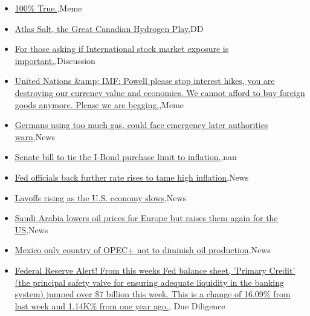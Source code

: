 \documentclass{article}%
\begin{document}
%
\begin{itemize}%
\item%
\href{https://reddit.com/r/wallstreetbets/comments/xxonc9/100\_true/}{100\% True.},Meme%
\item%
\href{https://reddit.com/r/Baystreetbets/comments/xx9i0i/atlas\_salt\_the\_great\_canadian\_hydrogen\_play/}{Atlas Salt, the Great Canadian Hydrogen Play},DD%
\item%
\href{https://reddit.com/r/StockMarket/comments/xxk02m/for\_those\_asking\_if\_international\_stock\_market/}{For those asking if International stock market exposure is important.},Discussion%
\item%
\href{https://reddit.com/r/StockMarket/comments/xxgjta/united\_nations\_imf\_powell\_please\_stop\_interest/}{United Nations \&amp; IMF: Powell please stop interest hikes, you are destroying our currency value and economies. We cannot afford to buy foreign goods anymore. Please we are begging.},Meme%
\item%
\href{https://reddit.com/r/Economics/comments/xxltx4/germans\_using\_too\_much\_gas\_could\_face\_emergency/}{Germans using too much gas, could face emergency later authorities warn},News%
\item%
\href{https://reddit.com/r/Economics/comments/xxjfs9/senate\_bill\_to\_tie\_the\_ibond\_purchase\_limit\_to/}{Senate bill to tie the I-Bond purchase limit to inflation.},nan%
\item%
\href{https://reddit.com/r/Economics/comments/xxi0sx/fed\_officials\_back\_further\_rate\_rises\_to\_tame/}{Fed officials back further rate rises to tame high inflation},News%
\item%
\href{https://reddit.com/r/Economics/comments/xxfsky/layoffs\_rising\_as\_the\_us\_economy\_slows/}{Layoffs rising as the U.S. economy slows},News%
\item%
\href{https://reddit.com/r/Economics/comments/xxe2cb/saudi\_arabia\_lowers\_oil\_prices\_for\_europe\_but/}{Saudi Arabia lowers oil prices for Europe but raises them again for the US},News%
\item%
\href{https://reddit.com/r/Economics/comments/xxd9vk/mexico\_only\_country\_of\_opec\_not\_to\_diminish\_oil/}{Mexico only country of OPEC+ not to diminish oil production},News%
\item%
\href{https://reddit.com/r/Superstonk/comments/xxn9td/federal\_reserve\_alert\_from\_this\_weeks\_fed\_balance/}{Federal Reserve Alert! From this weeks Fed balance sheet, 'Primary Credit' (the principal safety valve for ensuring adequate liquidity in the banking system) jumped over \$7 billion this week. This is a change of 16.09\% from last week and 1.14K\% from one year ago.}, Due Diligence%
\end{itemize}%
\end{document}
